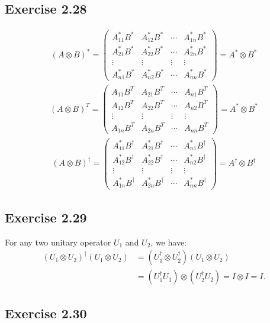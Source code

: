 \subsection*{Exercise 2.28}
\begin{align}
(A\otimes B)^*=\begin{pmatrix}
A_{11}^* B^*&A_{12}^*B^* & \cdots & A_{1n}^*B^*\\
A_{21}^* B^*&A_{22}^*B^* & \cdots & A_{2n}^*B^*\\
\vdots & \vdots & \vdots &\vdots \\
A_{n1}^* B^*&A_{n2}^*B^* & \cdots & A_{nn}^*B^*
\end{pmatrix}=A^*\otimes B^*
\end{align}
\begin{align}
(A\otimes B)^T=\begin{pmatrix}
A_{11} B^T&A_{21}B^T & \cdots & A_{n1}B^T\\
A_{12} B^T&A_{22}B^T & \cdots & A_{n2}B^T\\
\vdots & \vdots & \vdots &\vdots \\
A_{1n} B^T&A_{2n}B^T & \cdots & A_{nn}B^T
\end{pmatrix}=A^*\otimes B^*
\end{align}
\begin{align}
(A\otimes B)^\dagger=\begin{pmatrix}
A_{11}^* B^\dagger&A_{21}^* B^\dagger & \cdots & A_{n1}^*  B^\dagger\\
A_{12}^* B^\dagger&A_{22}^*B^\dagger & \cdots & A_{n2}^*B^\dagger\\
\vdots & \vdots & \vdots &\vdots \\
A_{1n}^* B^\dagger&A_{2n}^*B^\dagger & \cdots & A_{nn}^*B^\dagger
\end{pmatrix}= A^\dagger \otimes B^\dagger
\end{align}

\subsection*{Exercise 2.29}

For any two unitary operator $U_1$ and $U_2$, we have:
\begin{align}
(U_1\otimes U_2)^\dagger (U_1\otimes U_2) &=(U_1^\dagger\otimes U_2^\dagger) (U_1\otimes U_2)\\
&=(U_1^\dagger U_1)\otimes (U_2^\dagger U_2)=I\otimes I=I.
\end{align}

\subsection*{Exercise 2.30}

